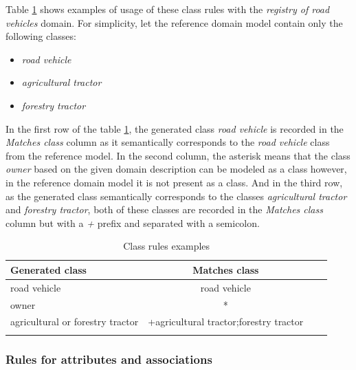 Table \ref{tab:class-rules} shows examples of usage of these class rules with the \textit{registry of road vehicles} domain. For simplicity, let the reference domain model contain only the following classes:

\begin{itemize}
\item \textit{road vehicle}
\item \textit{agricultural tractor}
\item \textit{forestry tractor}
\end{itemize}

\noindent{}In the first row of the table \ref{tab:class-rules}, the generated class \textit{road vehicle} is recorded in the \textit{Matches class} column as it semantically corresponds to the \textit{road vehicle} class from the reference model. In the second column, the asterisk means that the class \textit{owner} based on the given domain description can be modeled as a class however, in the reference domain model it is not present as a class. And in the third row, as the generated class semantically corresponds to the classes \textit{agricultural tractor} and \textit{forestry tractor}, both of these classes are recorded in the \textit{Matches class} column but with a \textit{+} prefix and separated with a semicolon.

\begin{table}[!h]
    \scriptsize
    \centering
    \setlength{\tabcolsep}{0.5em}
    \begin{tabular}{lccc}
     \toprule
         Generated class & Matches class \\
    \toprule
    
\addlinespace
road vehicle   & road vehicle \\
\addlinespace
owner         & * \\
\addlinespace
agricultural or forestry tractor & +agricultural tractor;forestry tractor \\
    \addlinespace
    \bottomrule
    \addlinespace
    \end{tabular}
    \caption{Class rules examples}
    \label{tab:class-rules}
\end{table}



\subsubsection{Rules for attributes and associations}

